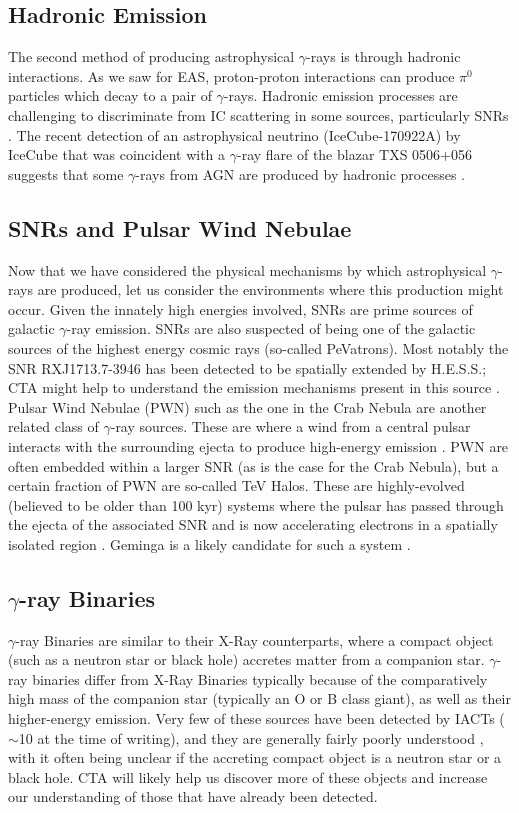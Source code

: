 \subsection{Hadronic Emission}
The second method of producing astrophysical $\gamma$-rays is through hadronic interactions. As we saw for EAS, proton-proton interactions can produce $\pi^0$ particles which decay to a pair of $\gamma$-rays. Hadronic emission processes are challenging to discriminate from IC scattering in some sources, particularly SNRs \cite{rxjcta}. The recent detection of an astrophysical neutrino (IceCube-170922A) by IceCube that was coincident with a $\gamma$-ray flare of the blazar TXS 0506+056 suggests that some $\gamma$-rays from AGN are produced by hadronic processes \cite{TXS}. 

\subsection{SNRs and Pulsar Wind Nebulae}
Now that we have considered the physical mechanisms by which astrophysical $\gamma$-rays are produced, let us consider the environments where this production might occur. Given the innately high energies involved, SNRs are prime sources of galactic $\gamma$-ray emission. SNRs are also suspected of being one of the galactic sources of the highest energy cosmic rays (so-called PeVatrons). Most notably the SNR RXJ1713.7-3946 has been detected to be spatially extended by H.E.S.S.; CTA might help to understand the emission mechanisms present in this source \cite{rxjcta}. Pulsar Wind Nebulae (PWN) such as the one in the Crab Nebula are another related class of $\gamma$-ray sources. These are where a wind from a central pulsar interacts with the surrounding ejecta to produce high-energy emission \cite{magiccrab}. PWN are often embedded within a larger SNR (as is the case for the Crab Nebula), but a certain fraction of PWN are so-called TeV Halos. These are highly-evolved (believed to be older than 100 kyr) systems where the pulsar has passed through the ejecta of the associated SNR and is now accelerating electrons in a spatially isolated region \cite{tevhalo}. Geminga is a likely candidate for such a system \cite{geminga}.

\subsection{$\gamma$-ray Binaries}
$\gamma$-ray Binaries are similar to their X-Ray counterparts, where a compact object (such as a neutron star or black hole) accretes matter from a companion star. $\gamma$-ray binaries differ from X-Ray Binaries typically because of the comparatively high mass of the companion star (typically an O or B class giant), as well as their higher-energy emission. Very few of these sources have been detected by IACTs ($\sim$10 at the time of writing), and they are generally fairly poorly understood \cite{scienceCTA}, with it often being unclear if the accreting compact object is a neutron star or a black hole. CTA will likely help us discover more of these objects and increase our understanding of those that have already been detected.

